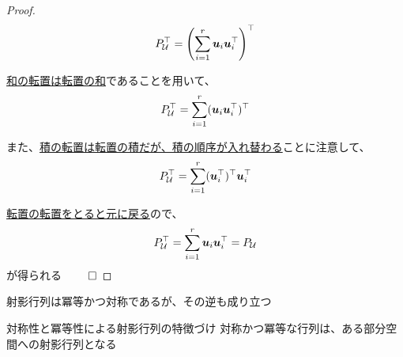 \documentclass[../../../topic_linear-algebra]{subfiles}
\begin{document}
\begin{proof}
  \begin{equation*}
    P_{\mathcal{U}}^\top = \left( \sum_{i=1}^{r} \vb*{u}_i\vb*{u}_i^\top \right)^\top
  \end{equation*}

  \hyperref[thm:transpose-distributes-over-sum]{和の転置は転置の和}であることを用いて、
  \begin{equation*}
    P_{\mathcal{U}}^\top = \sum_{i=1}^{r} (\vb*{u}_i\vb*{u}_i^\top)^\top
  \end{equation*}

  また、\hyperref[thm:transpose-of-product]{積の転置は転置の積だが、積の順序が入れ替わる}ことに注意して、
  \begin{equation*}
    P_{\mathcal{U}}^\top = \sum_{i=1}^{r} (\vb*{u}_i^\top)^\top \vb*{u}_i^\top
  \end{equation*}

  \hyperref[thm:transpose-involution]{転置の転置をとると元に戻る}ので、
  \begin{equation*}
    P_{\mathcal{U}}^\top = \sum_{i=1}^{r} \vb*{u}_i \vb*{u}_i^\top = P_{\mathcal{U}}
  \end{equation*}
  が得られる $\qed$
\end{proof}

\sectionline

射影行列は冪等かつ対称であるが、その逆も成り立つ

\begin{theorem*}{対称性と冪等性による射影行列の特徴づけ}
  対称かつ冪等な行列は、ある部分空間への射影行列となる
\end{theorem*}
\end{document}
